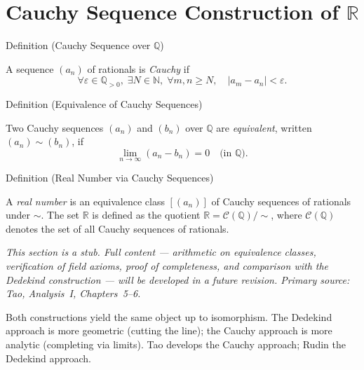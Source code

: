 
\section{\texorpdfstring{Cauchy Sequence Construction of $\mathbb{R}$}{Cauchy Sequence Construction of R}}

\begin{definitionbox}{Definition (Cauchy Sequence over $\mathbb{Q}$)}
\begin{definition}\label{def:cauchy-q}
A sequence $(a_n)$ of rationals is \emph{Cauchy} if
\[
  \forall \varepsilon \in \mathbb{Q}_{>0},\;
  \exists N \in \mathbb{N},\;
  \forall m, n \geq N,\quad |a_m - a_n| < \varepsilon.
\]
\end{definition}
\end{definitionbox}

\begin{definitionbox}{Definition (Equivalence of Cauchy Sequences)}
\begin{definition}\label{def:cauchy-equiv}
Two Cauchy sequences $(a_n)$ and $(b_n)$ over $\mathbb{Q}$ are
\emph{equivalent}, written $(a_n) \sim (b_n)$, if
\[
  \lim_{n\to\infty}(a_n - b_n) = 0 \quad \text{(in } \mathbb{Q}\text{)}.
\]
\end{definition}
\end{definitionbox}

\begin{definitionbox}{Definition (Real Number via Cauchy Sequences)}
\begin{definition}\label{def:real-as-cauchy}
A \emph{real number} is an equivalence class $[(a_n)]$ of Cauchy sequences
of rationals under $\sim$.
The set $\mathbb{R}$ is defined as the quotient
$\mathbb{R} = \mathcal{C}(\mathbb{Q}) / {\sim}$,
where $\mathcal{C}(\mathbb{Q})$ denotes the set of all Cauchy sequences
of rationals.
\end{definition}
\end{definitionbox}

\begin{remark*}[Status]
\textit{This section is a stub. Full content --- arithmetic on equivalence classes,
verification of field axioms, proof of completeness, and comparison with the
Dedekind construction --- will be developed in a future revision.
Primary source: Tao, \textit{Analysis~I}, Chapters~5--6.}
\end{remark*}

\begin{remark*}
Both constructions yield the same object up to isomorphism.
The Dedekind approach is more geometric (cutting the line);
the Cauchy approach is more analytic (completing via limits).
Tao develops the Cauchy approach; Rudin the Dedekind approach.
\end{remark*}
